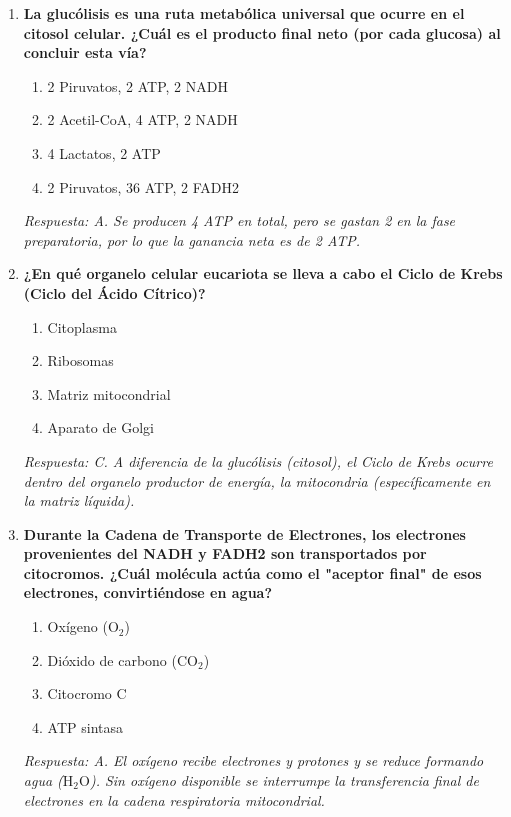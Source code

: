 \begin{enumerate}[label=\textbf{\arabic*.}]
    \item \textbf{La glucólisis es una ruta metabólica universal que ocurre en el citosol celular. ¿Cuál es el producto final neto (por cada glucosa) al concluir esta vía?}
    \begin{enumerate}
        \item[A)] 2 Piruvatos, 2 ATP, 2 NADH
        \item[B)] 2 Acetil-CoA, 4 ATP, 2 NADH
        \item[C)] 4 Lactatos, 2 ATP
        \item[D)] 2 Piruvatos, 36 ATP, 2 FADH2
    \end{enumerate}
    \textit{Respuesta: A. Se producen 4 ATP en total, pero se gastan 2 en la fase preparatoria, por lo que la ganancia neta es de 2 ATP.}

    \item \textbf{¿En qué organelo celular eucariota se lleva a cabo el Ciclo de Krebs (Ciclo del Ácido Cítrico)?}
    \begin{enumerate}
        \item[A)] Citoplasma
        \item[B)] Ribosomas
        \item[C)] Matriz mitocondrial
        \item[D)] Aparato de Golgi
    \end{enumerate}
    \textit{Respuesta: C. A diferencia de la glucólisis (citosol), el Ciclo de Krebs ocurre dentro del organelo productor de energía, la mitocondria (específicamente en la matriz líquida).}

    \item \textbf{Durante la Cadena de Transporte de Electrones, los electrones provenientes del NADH y FADH2 son transportados por citocromos. ¿Cuál molécula actúa como el "aceptor final" de esos electrones, convirtiéndose en agua?}
    \begin{enumerate}
        \item[A)] Oxígeno ($\mathrm{O}_{2}$)
        \item[B)] Dióxido de carbono ($\mathrm{CO}_{2}$)
        \item[C)] Citocromo C
        \item[D)] ATP sintasa
    \end{enumerate}
    \textit{Respuesta: A. El oxígeno recibe electrones y protones y se reduce formando agua ($\mathrm{H}_{2}\mathrm{O}$). Sin oxígeno disponible se interrumpe la transferencia final de electrones en la cadena respiratoria mitocondrial.}


\end{enumerate}
